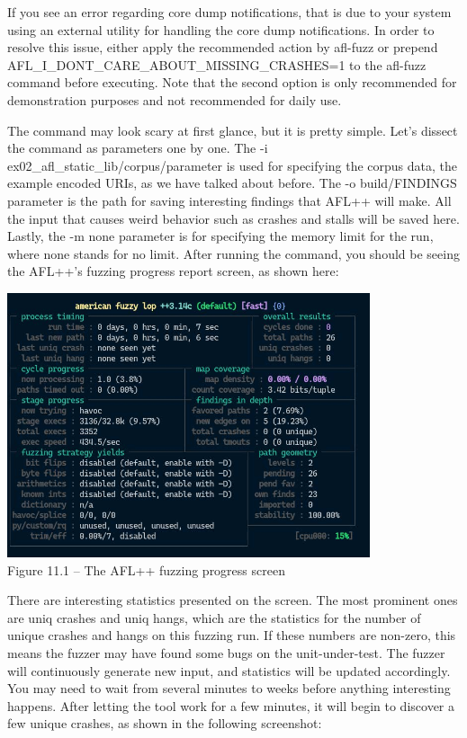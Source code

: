\begin{tcolorbox}[colback=blue!5!white,colframe=blue!75!black,title=Important note]
If you see an error regarding core dump notifications, that is due to your system using an external utility for handling the core dump notifications. In order to resolve this issue, either apply the recommended action by afl-fuzz or prepend AFL\_I\_DONT\_CARE\_ABOUT\_MISSING\_CRASHES=1 to the afl-fuzz command before executing. Note that the second option is only recommended for demonstration purposes and not recommended for daily use.
\end{tcolorbox}

The command may look scary at first glance, but it is pretty simple. Let's dissect the command as parameters one by one. The -i ex02\_afl\_static\_lib/corpus/parameter is used for specifying the corpus data, the example encoded URIs, as we have talked about before. The -o build/FINDINGS parameter is the path for saving interesting findings that AFL++ will make. All the input that causes weird behavior such as crashes and stalls will be saved here. Lastly, the -m none parameter is for specifying the memory limit for the run, where none stands for no limit. After running the command, you should be seeing the AFL++'s fuzzing progress report screen, as shown here:

\begin{center}
\includegraphics[width=0.8\textwidth]{content/2/chapter11/images/1.jpg}\\
Figure 11.1 – The AFL++ fuzzing progress screen
\end{center}

There are interesting statistics presented on the screen. The most prominent ones are uniq crashes and uniq hangs, which are the statistics for the number of unique crashes and hangs on this fuzzing run. If these numbers are non-zero, this means the fuzzer may have found some bugs on the unit-under-test. The fuzzer will continuously generate new input, and statistics will be updated accordingly. You may need to wait from several minutes to weeks before anything interesting happens. After letting the tool work for a few minutes, it will begin to discover a few unique crashes, as shown in the following screenshot:

